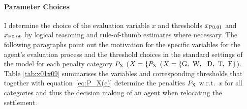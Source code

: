 
\paragraph{Parameter Choices} %
I determine the choice of the evaluation variable $x$ and thresholds $x_{\rm P0.01}$ and $x_{\rm P0.99}$ by logical reasoning and rule-of-thumb estimates where necessary.
The following paragraphs point out the motivation for the specific variables for the agent's evaluation process and the threshold choices in the standard settings of the model for each penalty category $P_{\rm X}$ ($X=\{P_{\rm X}$ ($X=\{\text{G,\, W, \, D,\, T,\, F}\}$).
Table \ref{tab:x01x09} summarises the variables and corresponding thresholds that together with equation~\ref{eq:P_X(c)} determine the penalties $P_{\rm X}$ w.r.t.\ $x$ for all categories and thus the decision making of an agent when relocating the settlement.


